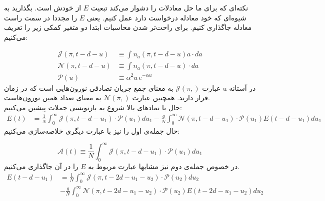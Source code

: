 نکته‌ای که برای ما حل معادلات را دشوار می‌کند تبعیت $E$ از خودش است. بگذارید به شیوه‌ای که خود معادله درخواست دارد عمل کنیم. یعنی $E$ را مجددا در سمت راست معادله جاگذاری کنیم. برای راحت‌تر شدن محاسبات ابتدا دو متغیر کمکی زیر را تعریف می‌کنیم:
\newcommand{\J}[1]{\mathcal{J}(\pi,#1)}
\newcommand{\N}[1]{\mathcal{N}(\pi, #1)}
\newcommand{\Pexp}[1]{\mathcal{P}(u_{#1})}

\newcommand{\A}[1]{\mathcal{A}(#1)}

%
\begin{align}
	\J{t-d-u} &\equiv \int n_a(\pi,t-d-u) a \cdot da\\
	\N{t-d-u} &\equiv \int n_a(\pi,t-d-u) \cdot da\\
	\Pexp{} &\equiv \alpha^2 u\, e^{-\alpha u}
\end{align}
عبارت $\J{}$ به معنای جمع جریان تصادفی نورون‌هایی است که در زمان u در آستانه قرار دارند. همچنین عبارت $\N{}$ به معنای تعداد همین نورون‌هاست.\\
حال با نمادهای بالا شروع به بازنویسی جملات پیشین می‌کنیم:
\begin{align}
	E(t) &= \frac{1}{N} \int_{0}^{\infty} \J{t-d-u_1} \cdot \Pexp{1} du_1  - \frac{g}{N}\int_{0}^{\infty} \N{t-d-u_1} \cdot \Pexp{1} E(t-d-u_1)  du_1
\end{align}
حال جمله‌ی اول را نیز با عبارت دیگری خلاصه‌سازی می‌کنیم:

\begin{equation}
	\A{t} \equiv \frac{1}{N}\int_{0}^{\infty} \J{t-d-u_1} \cdot \Pexp{1} du_1
\end{equation}
در خصوص جمله‌ی دوم نیز مشابها عبارت مربوط به $E$ را در آن جاگذاری می‌کنیم.
\begin{align}
	E(t - d - u_1) &= \frac{1}{N} \int_{0}^{\infty} \J{t-2d-u_1-u_2} \cdot \Pexp{2} du_2\\
	&- \frac{g}{N}\int_{0}^{\infty} \N{t-2d-u_1-u_2} \cdot \Pexp{2} E(t-2d-u_1-u_2)  du_2
\end{align}

